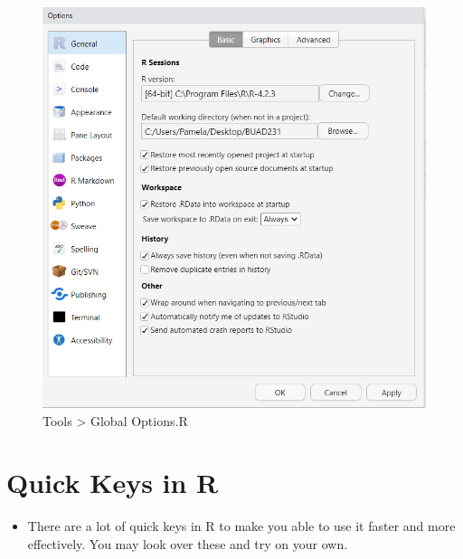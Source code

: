 \documentclass[
  letterpaper,
  DIV=11,
  numbers=noendperiod]{scrreprt}
\providecommand{\tightlist}{%
  \setlength{\itemsep}{0pt}\setlength{\parskip}{0pt}}\usepackage{longtable,booktabs,array}
\begin{document}
\begin{figure}[H]

{\centering \includegraphics{Pictures/Ch0/Options.png}

}

\caption{Tools \textgreater{} Global Options.R}

\end{figure}%

\section{Quick Keys in R}\label{quick-keys-in-r}

\begin{itemize}
\tightlist
\item
  There are a lot of quick keys in R to make you able to use it faster
  and more effectively. You may look over these and try on your own.
\end{itemize}
\end{document}
